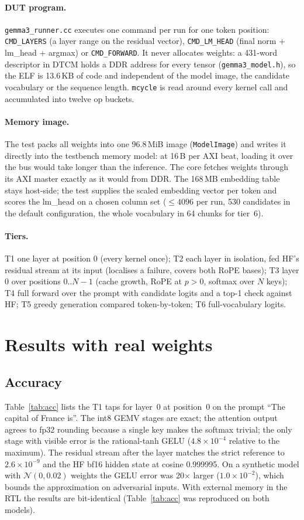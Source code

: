 \documentclass[10pt,twocolumn]{article}
\begin{document}
\paragraph{DUT program.} \texttt{gemma3\_runner.cc} executes one command per
run for one token position: \texttt{CMD\_LAYERS} (a layer range on the
residual vector), \texttt{CMD\_LM\_HEAD} (final norm + lm\_head + argmax) or
\texttt{CMD\_FORWARD}. It never allocates weights: a 431-word descriptor in
DTCM holds a DDR address for every tensor (\texttt{gemma3\_model.h}), so the
ELF is 13.6\,KB of code and independent of the model image, the candidate
vocabulary or the sequence length. \texttt{mcycle} is read around every kernel
call and accumulated into twelve op buckets.

\paragraph{Memory image.} The test packs all weights into one 96.8\,MiB image
(\texttt{ModelImage}) and writes it directly into the testbench memory model:
at 16\,B per AXI beat, loading it over the bus would take longer than the
inference. The core fetches weights through its AXI master exactly as it would
from DDR. The 168\,MB embedding table stays host-side; the test supplies the
scaled embedding vector per token and scores the lm\_head on a chosen column
set ($\le 4096$ per run, 530 candidates in the default configuration, the whole
vocabulary in 64 chunks for tier~6).

\paragraph{Tiers.} T1 one layer at position 0 (every kernel once); T2 each
layer in isolation, fed HF's residual stream at its input (localises a failure,
covers both RoPE bases); T3 layer 0 over positions $0..N{-}1$ (cache growth,
RoPE at $p>0$, softmax over $N$ keys); T4 full forward over the prompt with
candidate logits and a top-1 check against HF; T5 greedy generation compared
token-by-token; T6 full-vocabulary logits.

\section{Results with real weights}
\subsection{Accuracy}
Table~\ref{tab:acc} lists the T1 taps for layer~0 at position~0 on the prompt
``The capital of France is''. The int8 GEMV stages are exact; the attention
output agrees to fp32 rounding because a single key makes the softmax trivial;
the only stage with visible error is the rational-tanh GELU
($4.8\times10^{-4}$ relative to the maximum). The residual stream after the
layer matches the strict reference to $2.6\times10^{-9}$ and the HF bf16
hidden state at cosine 0.999995. On a synthetic model with $\mathcal N(0,0.02)$
weights the GELU error was 20$\times$ larger ($1.0\times10^{-2}$), which
bounds the approximation on adversarial inputs.
With external memory in the RTL the results are bit-identical
(Table~\ref{tab:acc} was reproduced on both models).
\end{document}
